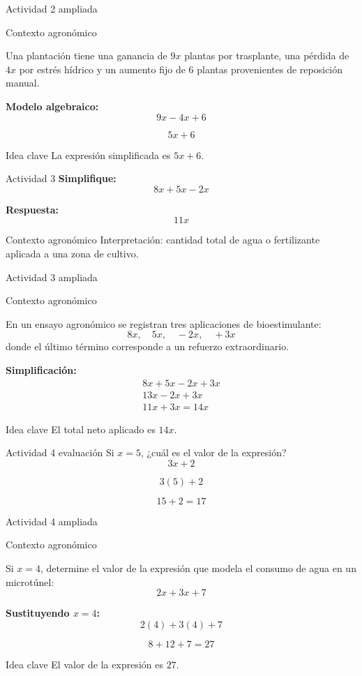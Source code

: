 \documentclass[aspectratio=169,12pt]{beamer}
\newcommand{\IdeaClave}[1]{
	\begin{alertblock}{Idea clave}
		#1
	\end{alertblock}
}
\newcommand{\Agronomia}[1]{
	\begin{exampleblock}{Contexto agronómico}
		#1
	\end{exampleblock}
}
\begin{document}
	\begin{frame}{Actividad 2 ampliada}
		\Agronomia{
			Una plantación tiene una ganancia de \(9x\) plantas por trasplante, una pérdida de \(4x\) por estrés hídrico y un aumento fijo de 6 plantas provenientes de reposición manual.
		}
		
		\pause
		\textbf{Modelo algebraico:}
		\[
		9x-4x+6
		\]
		
		\pause
		\[
		5x+6
		\]
		
		\pause
		\IdeaClave{La expresión simplificada es \(5x+6\).}
	\end{frame}
	
	\begin{frame}{Actividad 3}
		\textbf{Simplifique:}
		\[
		8x+5x-2x
		\]
		
		\pause
		\textbf{Respuesta:}
		\[
		11x
		\]
		
		\pause
		\Agronomia{Interpretación: cantidad total de agua o fertilizante aplicada a una zona de cultivo.}
	\end{frame}
	
	\begin{frame}{Actividad 3 ampliada}
		\Agronomia{
			En un ensayo agronómico se registran tres aplicaciones de bioestimulante:
			\[
			8x,\quad 5x,\quad -2x,\quad +3x
			\]
			donde el último término corresponde a un refuerzo extraordinario.
		}
		
		\pause
		\textbf{Simplificación:}
		\[
		\begin{array}{c}
		  8x+5x-2x+3x \\
		  13x-2x+3x \\
		  11x+3x=14x
		\end{array}
		\]
		\IdeaClave{El total neto aplicado es \(14x\).}
	\end{frame}
	
	\begin{frame}{Actividad 4 evaluación}
		Si \(x=5\), ¿cuál es el valor de la expresión?
		\[
		3x+2
		\]
		
		\pause
		\[
		3(5)+2
		\]
		
		\pause
		\[
		15+2=17
		\]
	\end{frame}
	
	\begin{frame}{Actividad 4 ampliada}
		\Agronomia{
			Si \(x=4\), determine el valor de la expresión que modela el consumo de agua en un microtúnel:
			\[
			2x+3x+7
			\]
		}
		
		\pause
		\textbf{Sustituyendo \(x=4\):}
		\[
		2(4)+3(4)+7
		\]
		
		\pause
		\[
		8+12+7 = 27
		\]
		
		\pause
		\IdeaClave{El valor de la expresión es \(27\).}
	\end{frame}
	
\end{document}
